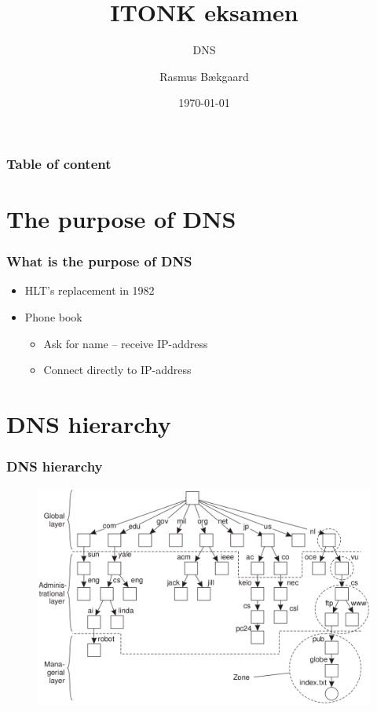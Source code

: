 \documentclass{beamer}
\title{ITONK eksamen}
\subtitle{DNS}
\author %
{Rasmus Bækgaard\inst{1}}
\institute%
{
  \inst{1}%
  Information og Kommunikationsteknologi\\
  Ingeniørhøjskolen i Aarhus
}
\date{\today}
\begin{document}
	\frame{\titlepage}
	
	\begin{frame}
		\frametitle{Table of content}
		\tableofcontents%
	\end{frame}

\section{The purpose of DNS}
	\begin{frame}
		\frametitle{What is the purpose of DNS}
		
		
			\begin{itemize}
			\item HLT's replacement in 1982
			\item Phone book
			
				\begin{itemize}
				\item Ask for name -- receive IP-address
				\item Connect directly to IP-address
				\end{itemize}
			
			\end{itemize}
		
	\end{frame}
	
\section{DNS hierarchy}
	\begin{frame}
		\frametitle{DNS hierarchy}
		
		\begin{figure}[hbtp]
		\centering
		\includegraphics[scale=0.4]{DNS-hierarki}
		\end{figure}
	\end{frame}
	
\end{document}
